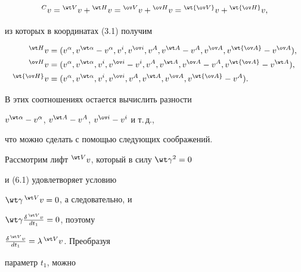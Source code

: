 \begin{equation}


{}^C v={}^{\wt V}v+{}^{\wt H}v={}^{\ov V}v+


{}^{\ov H}v={}^{\wt{\ov V}}v+{}^{\wt{\ov H}}v,


\end{equation}


из которых в координатах (3.1) получим


\begin{equation}


\begin{split}


{}^{\wt H}v&=(v^\alpha,v^{\wt\alpha}-v^\alpha,v^i,v^{\ov i},


v^A,v^{\wt A}-v^A,v^{\ov A},


v^{\wt{\ov A}}-v^{\ov A}), \\


%


{}^{\ov H}v&=(v^\alpha,v^{\wt\alpha},v^i,v^{\ov i}-v^i,


v^A,v^{\wt A},v^{\ov A}-v^A,


v^{\wt{\ov A}}-v^{\wt A}), \\


%


{}^{\wt{\ov H}}v&=(v^\alpha,v^{\wt\alpha},v^i,v^{\ov i},


v^A,v^{\wt A},v^{\ov A},


v^{\wt{\ov A}}-v^A).


\end{split}


\end{equation}


В этих соотношениях остается вычислить разности


$v^{\wt\alpha}-v^\alpha$, $v^{\wt A}-v^A$, $v^{\ov i}-v^i$ и т.\,д.,


что можно сделать с помощью следующих соображений.





Рассмотрим лифт ${}^{\wt V}v$, который в силу $\wt\gamma^2=0$


и (6.1) удовлетворяет условию


$\wt\gamma\,{}^{\wt V}v=0$, а следовательно, и


$\wt\gamma\frac{\delta\,{}^{\wt V}v}{dt_1}=0$, поэтому


$\frac{\delta\,{}^{\wt V}v}{dt_1}=\lambda\,{}^{\wt V}v$. Преобразуя


параметр $t_1$, можно



